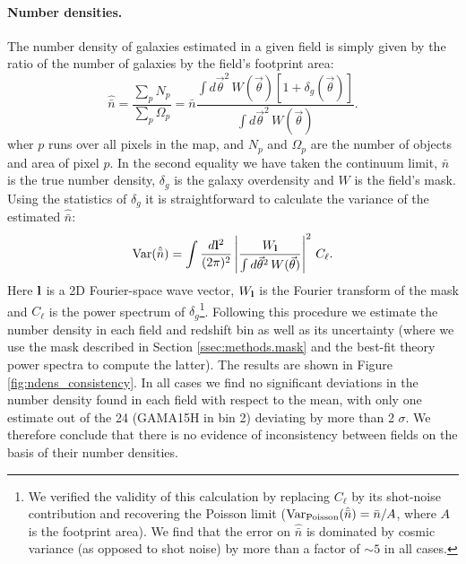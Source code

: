 \documentclass[a4paper,11pt]{article}
\newcommand{\nv}{\vec{\theta}}
\begin{document}
      \paragraph{Number densities.} The number density of galaxies estimated in a given field is simply given by the ratio of the number of galaxies by the field's footprint area:
      \begin{equation}
        \hat{\bar{n}}=\frac{\sum_p N_p}{\sum_p \Omega_p}= \bar{n} \frac{\int d\nv^2\,W(\nv)\left[1+\delta_g(\nv)\right]}{\int d\nv^2\,W(\nv)}.
      \end{equation}
      wher $p$ runs over all pixels in the map, and $N_p$ and $\Omega_p$ are the number of objects and area of pixel $p$. In the second equality we have taken the continuum limit, $\bar{n}$ is the true number density, $\delta_g$ is the galaxy overdensity and $W$ is the field's mask. Using the statistics of $\delta_g$ it is straightforward to calculate the variance of the estimated $\hat{\bar n}$:
      \begin{equation}
       {\rm Var}(\hat{\bar n})=\int \frac{d{\bf l}^2}{(2\pi)^2}\left|\frac{W_{\bf l}}{\int d\nv^2\,W(\nv)}\right|^2\,C_\ell.
      \end{equation}
      Here ${\bf l}$ is a 2D Fourier-space wave vector, $W_{\bf l}$ is the Fourier transform of the mask and $C_\ell$ is the power spectrum of $\delta_g$\footnote{We verified the validity of this calculation by replacing $C_\ell$ by its shot-noise contribution and recovering the Poisson limit (${\rm Var}_{\rm Poisson}(\hat{\bar n})=\bar{n}/A$, where $A$ is the footprint area). We find that the error on $\hat{\bar n}$ is dominated by cosmic variance (as opposed to shot noise) by more than a factor of $\sim5$ in all cases.}. Following this procedure we estimate the number density in each field and redshift bin as well as its uncertainty (where we use the mask described in Section \ref{ssec:methods.mask} and the best-fit theory power spectra to compute the latter). The results are shown in Figure \ref{fig:ndens_consistency}. In all cases we find no significant deviations in the number density found in each field with respect to the mean, with only one estimate out of the 24 (GAMA15H in bin 2) deviating by more than 2 $\sigma$. We therefore conclude that there is no evidence of inconsistency between fields on the basis of their number densities.
\end{document}
